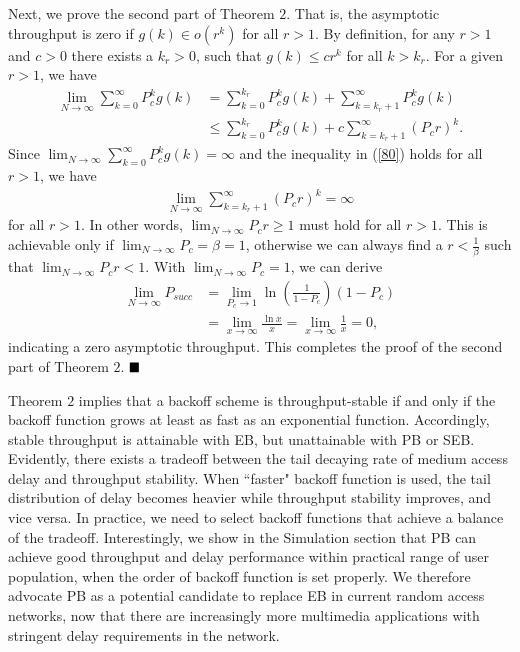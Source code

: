 \documentclass[journal]{IEEEtran}
\begin{document}
Next, we prove the second part of Theorem $2$. That is, the asymptotic throughput is zero if $g(k)\in o\left(r^k\right)$ for all $r>1$. By definition, for any $r>1$ and $c>0$ there exists a $k_r>0$, such that $g(k)\leq cr^k$ for all $k>k_r$. For a given $r>1$, we have
\begin{equation}
\label{80}
\begin{aligned}
\lim_{N\rightarrow \infty}\sum_{k=0}^{\infty} P_c^kg(k) &= \sum_{k=0}^{k_r} P_c^kg(k) + \sum_{k=k_r+1}^{\infty} P_c^kg(k)\\
&\leq \sum_{k=0}^{k_r} P_c^kg(k) + c \sum_{k=k_r+1}^{\infty} \left(P_cr\right)^k.
\end{aligned}
\end{equation}
Since $\lim_{N\rightarrow \infty}\sum_{k=0}^{\infty} P_c^kg(k)= \infty$ and the inequality in (\ref{80}) holds for all $r>1$, we have
\begin{equation}
\begin{aligned}
\lim_{N\rightarrow \infty} \sum_{k=k_r+1}^{\infty} \left(P_cr\right)^k = \infty
\end{aligned}
\end{equation}
for all $r>1$. In other words, $\lim_{N\rightarrow \infty}P_cr\geq 1$ must hold for all $r>1$. This is achievable only if $\lim_{N\rightarrow \infty}P_c=\beta=1$, otherwise we can always find a $r<\frac{1}{\beta}$ such that $\lim_{N\rightarrow \infty}P_cr< 1$. With $\lim_{N\rightarrow \infty}P_c=1$, we can derive
\begin{equation}
\label{43}
\begin{aligned}
\lim_{N\rightarrow \infty}P_{succ}&=\lim_{P_c\rightarrow 1}\ln \left(\frac{1}{1-P_c}\right)(1-P_c) \\
&= \lim_{x\rightarrow \infty} \frac{\ln x}{x}=\lim_{x\rightarrow \infty}\frac{1}{x} = 0,
\end{aligned}
\end{equation}
indicating a zero asymptotic throughput. This completes the proof of the second part of Theorem $2$. $\hfill \blacksquare$

Theorem $2$ implies that a backoff scheme is throughput-stable if and only if the backoff function grows at least as fast as an exponential function. Accordingly, stable throughput is attainable with EB, but unattainable with PB or SEB. Evidently, there exists a tradeoff between the tail decaying rate of medium access delay and throughput stability. When ``faster" backoff function is used, the tail distribution of delay becomes heavier while throughput stability improves, and vice versa. In practice, we need to select backoff functions that achieve a balance of the tradeoff. Interestingly, we show in the Simulation section that PB can achieve good throughput and delay performance within practical range of user population, when the order of backoff function is set properly. We therefore advocate PB as a potential candidate to replace EB in current random access networks, now that there are increasingly more multimedia applications with stringent delay requirements in the network.
\end{document}
